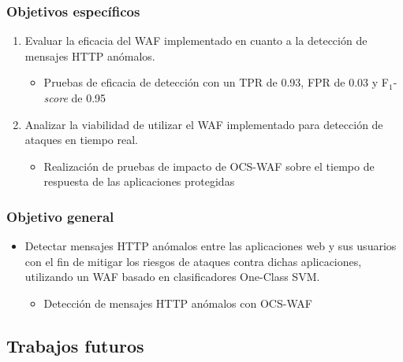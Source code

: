 \begin{frame}
    \frametitle{Objetivos específicos}

    \begin{enumerate}[<+->]
        \contmynewenumi

        \item
        Evaluar la eficacia del WAF implementado en cuanto a la detección
        de mensajes HTTP anómalos.

        \begin{itemize}[<.->]
            \item
            Pruebas de eficacia de detección con un
            TPR de \num{0.93},
            FPR de \num{0.03} y
            F$_{1}$-\textit{score} de \num{0.95}
        \end{itemize}

        \item
        Analizar la viabilidad de utilizar el WAF implementado para
        detección de ataques en tiempo real.

        \begin{itemize}[<.->]
            \item
            Realización de pruebas de impacto de OCS-WAF sobre el tiempo
            de respuesta de las aplicaciones protegidas
        \end{itemize}
    \end{enumerate}
\end{frame}

\begin{frame}
    \frametitle{Objetivo general}

    \begin{itemize}[<+(1)->]
        \item
        Detectar mensajes HTTP anómalos entre las aplicaciones web y
        sus usuarios con el fin de mitigar los riesgos de ataques contra
        dichas aplicaciones, utilizando un WAF basado en clasificadores
        One-Class SVM.

        \begin{itemize}[<.->]
            \item
            Detección de mensajes HTTP anómalos con OCS-WAF
        \end{itemize}
    \end{itemize}
\end{frame}



\subsection{Trabajos futuros}

